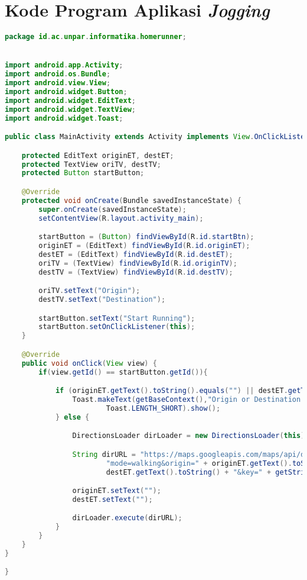 \chapter{Kode Program Aplikasi \textit{Jogging}}
\label{lamp:B}

\begin{lstlisting}[language=Java,caption=MainActivity.java]
package id.ac.unpar.informatika.homerunner;


import android.app.Activity;
import android.os.Bundle;
import android.view.View;
import android.widget.Button;
import android.widget.EditText;
import android.widget.TextView;
import android.widget.Toast;

public class MainActivity extends Activity implements View.OnClickListener {

    protected EditText originET, destET;
    protected TextView oriTV, destTV;
    protected Button startButton;

    @Override
    protected void onCreate(Bundle savedInstanceState) {
        super.onCreate(savedInstanceState);
        setContentView(R.layout.activity_main);

        startButton = (Button) findViewById(R.id.startBtn);
        originET = (EditText) findViewById(R.id.originET);
        destET = (EditText) findViewById(R.id.destET);
        oriTV = (TextView) findViewById(R.id.originTV);
        destTV = (TextView) findViewById(R.id.destTV);

        oriTV.setText("Origin");
        destTV.setText("Destination");

        startButton.setText("Start Running");
        startButton.setOnClickListener(this);
    }

    @Override
    public void onClick(View view) {
        if(view.getId() == startButton.getId()){

            if (originET.getText().toString().equals("") || destET.getText().toString().equals("")) {
                Toast.makeText(getBaseContext(),"Origin or Destination Text Box can't be Empty",
                        Toast.LENGTH_SHORT).show();
            } else {

                DirectionsLoader dirLoader = new DirectionsLoader(this);

                String dirURL = "https://maps.googleapis.com/maps/api/directions/json?" +
                        "mode=walking&origin=" + originET.getText().toString() + "&destination=" +
                        destET.getText().toString() + "&key=" + getString(R.string.key);

                originET.setText("");
                destET.setText("");

                dirLoader.execute(dirURL);
            }
        }
    }
}

}
\end{lstlisting}


